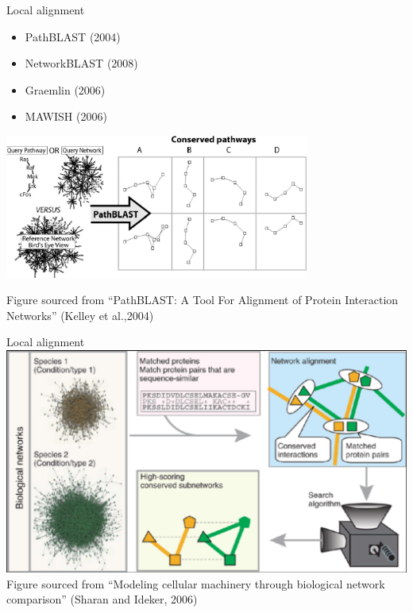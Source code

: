 \documentclass[xcolor=dvipsnames, 14pt]{beamer}
\begin{document}
\begin{frame}{Local alignment}
\begin{itemize}
\item PathBLAST (2004)
\item NetworkBLAST (2008)
\item Graemlin (2006)
\item MAWISH (2006)
\end{itemize}
\centering
\includegraphics[width=0.75\textwidth]{PathBLAST_demo.png}

\tiny Figure sourced from ``PathBLAST: A Tool For Alignment of Protein Interaction Networks'' (Kelley et al.,2004)
\end{frame}


\begin{frame}{Local alignment}
\centering
\includegraphics[width=\textwidth]{deterministic_local_alignment.png}
\tiny Figure sourced from ``Modeling cellular machinery through biological network comparison'' (Sharan and Ideker, 2006)
\end{frame}
\end{document}

